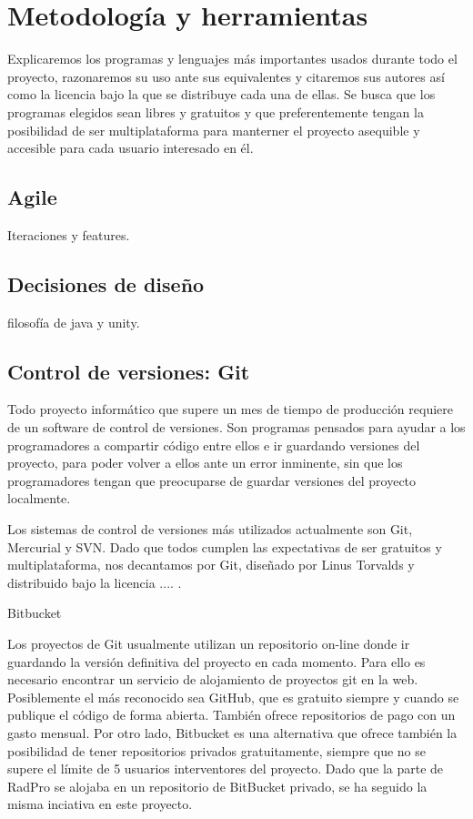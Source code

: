 \documentclass[12pt,a4paper,openright,oneside]{article}
\numberwithin{equation}{section}
\theoremstyle{definition}
\begin{document}
\section{Metodología y herramientas}

Explicaremos los programas y lenguajes más importantes usados durante todo el proyecto, razonaremos su uso ante sus equivalentes y citaremos sus autores así como la licencia bajo la que se distribuye cada una de ellas. Se busca que los programas elegidos sean libres y gratuitos y que preferentemente tengan la posibilidad de ser multiplataforma para manterner el proyecto asequible y accesible para cada usuario interesado en él.

\subsection{ Agile }
Iteraciones y features.
\subsection{ Decisiones de diseño }
filosofía de java y unity.
\subsection{ Control de versiones: Git }

Todo proyecto informático que supere un mes de tiempo de producción requiere de un software de control de versiones. Son programas pensados para ayudar a los programadores a compartir código entre ellos e ir guardando versiones del proyecto, para poder volver a ellos ante un error inminente, sin que los programadores tengan que preocuparse de guardar versiones del proyecto localmente. 

Los sistemas de control de versiones más utilizados actualmente son Git, Mercurial y SVN. Dado que todos cumplen las expectativas de ser gratuitos y multiplataforma, nos decantamos por Git, diseñado por Linus Torvalds y distribuido bajo la licencia .... .

Bitbucket

Los proyectos de Git usualmente utilizan un repositorio on-line donde ir guardando la versión definitiva del proyecto en cada momento. Para ello es necesario encontrar un servicio de alojamiento de proyectos git en la web. Posiblemente el más reconocido sea GitHub, que es gratuito siempre y cuando se publique el código de forma abierta. También ofrece repositorios de pago con un gasto mensual. Por otro lado, Bitbucket es una alternativa que ofrece también la posibilidad de tener repositorios privados gratuitamente, siempre que no se supere el límite de 5 usuarios interventores del proyecto. Dado que la parte de RadPro se alojaba en un repositorio de BitBucket privado, se ha seguido la misma inciativa en este proyecto.
\end{document}

